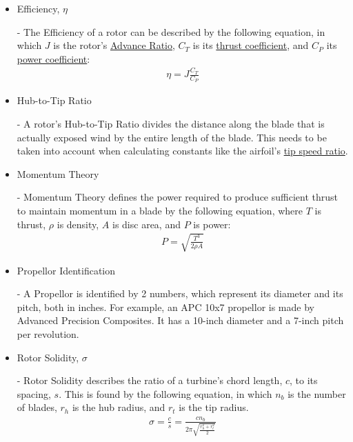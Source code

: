 \documentclass{article}
\begin{document}
\begin{itemize}
	\item \hypertarget{eta}{Efficiency, $\eta$} - The Efficiency of a rotor can be described by the following equation, in which $J$ is the rotor's \hyperlink{J}{Advance Ratio}, $C_{T}$ is its \hyperlink{CT}{thrust coefficient}, and $C_{P}$ its \hyperlink{CP}{power coefficient}:
	\begin{equation}
	\begin{aligned}
		\eta = J \frac{C_{T}}{C_{P}}
	\end{aligned}
	\end{equation}
	
	\item \hypertarget{D/D}{Hub-to-Tip Ratio} - A rotor's Hub-to-Tip Ratio divides the distance along the blade that is actually exposed wind by the entire length of the blade. This needs to be taken into account when calculating constants like the airfoil's \hyperlink{lambda}{tip speed ratio}.
	
	\item \hypertarget{MT}{Momentum Theory} - Momentum Theory defines the power required to produce sufficient thrust to maintain momentum in a blade by the following equation, where $T$ is thrust, $\rho$ is density, $A$ is disc area, and $P$ is power:
	\begin{equation}
	\begin{aligned}
        		P = \sqrt{\frac{T^{3}}{2 \rho A}}
	\end{aligned}
	\end{equation}
	
	\item \hypertarget{APC}{Propellor Identification} - A Propellor is identified by 2 numbers, which represent its diameter and its pitch, both in inches. For example, an APC 10x7 propellor is made by Advanced Precision Composites. It has a 10-inch diameter and a 7-inch pitch per revolution.
	
	\item \hypertarget{sigma}{Rotor Solidity, $\sigma$} - Rotor Solidity describes the ratio of a turbine's chord length, $c$, to its spacing, $s$. This is found by the following equation, in which $n_{b}$ is the number of blades, $r_{h}$ is the hub radius, and $r_{t}$ is the tip radius.
	\begin{equation}
	\begin{aligned}
		\sigma = \frac{c}{s} = \frac{c n_{b}}{2 \pi \sqrt{\frac{r^{2}_{h} + r^{2}_{t}}{2}}}
	\end{aligned}
	\end{equation}
	

\end{itemize}
\end{document}
